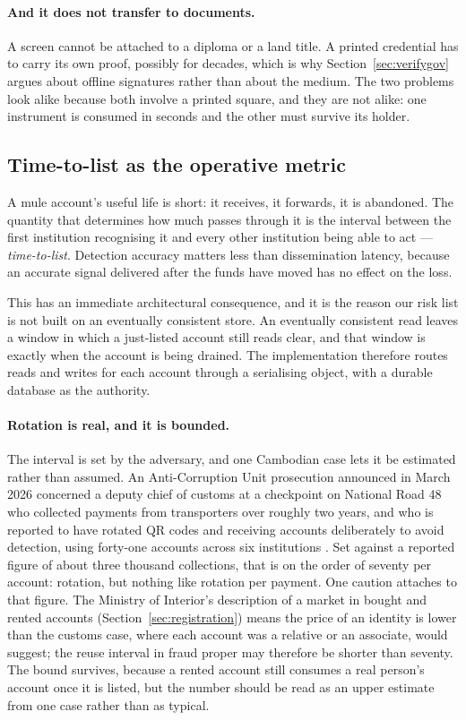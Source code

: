 \documentclass[10pt,a4paper,twocolumn]{article}
\begin{document}
\paragraph{And it does not transfer to documents.} A screen cannot be attached
to a diploma or a land title. A printed credential has to carry its own proof,
possibly for decades, which is why Section~\ref{sec:verifygov} argues about
offline signatures rather than about the medium. The two problems look alike
because both involve a printed square, and they are not alike: one instrument is
consumed in seconds and the other must survive its holder.

\subsection{Time-to-list as the operative metric}
\label{sec:ttl}

A mule account's useful life is short: it receives, it forwards, it is
abandoned. The quantity that determines how much passes through it is the
interval between the first institution recognising it and every other
institution being able to act --- \emph{time-to-list}. Detection accuracy matters
less than dissemination latency, because an accurate signal delivered after the
funds have moved has no effect on the loss.

This has an immediate architectural consequence, and it is the reason our risk
list is not built on an eventually consistent store. An eventually consistent
read leaves a window in which a just-listed account still reads clear, and that
window is exactly when the account is being drained. The implementation
therefore routes reads and writes for each account through a serialising object,
with a durable database as the authority.

\paragraph{Rotation is real, and it is bounded.}
The interval is set by the adversary, and one Cambodian case lets it be
estimated rather than assumed. An Anti-Corruption Unit prosecution announced in
March 2026 concerned a deputy chief of customs at a checkpoint on National Road
48 who collected payments from transporters over roughly two years, and who is
reported to have rotated QR codes and receiving accounts deliberately to avoid
detection, using forty-one accounts across six institutions
\citep{cambodianess2026kohkong}. Set against a reported figure of about three
thousand collections, that is on the order of seventy per account: rotation, but
nothing like rotation per payment. One caution attaches to that figure. The
Ministry of Interior's description of a market in bought and rented accounts
(Section~\ref{sec:registration}) means the price of an identity is lower than
the customs case, where each account was a relative or an associate, would
suggest; the reuse interval in fraud proper may therefore be shorter than
seventy. The bound survives, because a rented account still consumes a real
person's account once it is listed, but the number should be read as an upper
estimate from one case rather than as typical.
\end{document}

